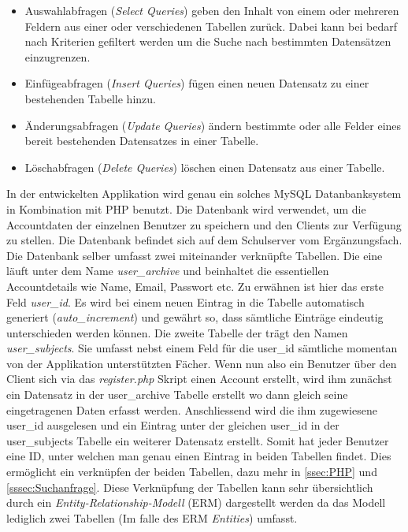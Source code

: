 \documentclass[a4paper,11pt]{report}
\begin{document}
				\begin{itemize}
					\item Auswahlabfragen (\emph{Select Queries}) geben den Inhalt von einem oder mehreren Feldern aus einer oder verschiedenen Tabellen zurück. Dabei kann bei bedarf nach Kriterien gefiltert werden um die Suche nach bestimmten Datensätzen einzugrenzen.\cite{IT-Handbuch}
					\item Einfügeabfragen (\emph{Insert Queries}) fügen einen neuen Datensatz zu einer bestehenden Tabelle hinzu.\cite{IT-Handbuch}
					\item Änderungsabfragen (\emph{Update Queries}) ändern bestimmte oder alle Felder eines bereit bestehenden Datensatzes in einer Tabelle.\cite{IT-Handbuch}
					\item Löschabfragen (\emph{Delete Queries}) löschen einen Datensatz aus einer Tabelle. \cite{IT-Handbuch}
				\end{itemize}
				In der entwickelten Applikation wird genau ein solches MySQL Datanbanksystem in Kombination mit PHP benutzt. Die Datenbank wird verwendet, um die Accountdaten der einzelnen Benutzer zu speichern und den Clients zur Verfügung zu stellen. Die Datenbank befindet sich auf dem Schulserver vom Ergänzungsfach. Die Datenbank selber umfasst zwei miteinander verknüpfte Tabellen. Die eine läuft unter dem Name \emph{user\_archive} und beinhaltet die essentiellen Accountdetails wie Name, Email, Passwort etc. Zu erwähnen ist hier das erste Feld \emph{user\_id}. Es wird bei einem neuen Eintrag in die Tabelle automatisch generiert (\emph{auto\_increment}) und gewährt so, dass sämtliche Einträge eindeutig unterschieden werden können. Die zweite Tabelle der trägt den Namen \emph{user\_subjects}. Sie umfasst nebst einem Feld für die user\_id sämtliche momentan von der Applikation unterstützten Fächer. Wenn nun also ein Benutzer über den Client sich via das \emph{register.php} Skript einen Account erstellt, wird ihm zunächst ein Datensatz in der user\_archive Tabelle erstellt wo dann gleich seine eingetragenen Daten erfasst werden. Anschliessend wird die ihm zugewiesene user\_id ausgelesen und ein Eintrag unter der gleichen user\_id in der user\_subjects Tabelle ein weiterer Datensatz erstellt. Somit hat jeder Benutzer eine ID, unter welchen man genau einen Eintrag in beiden Tabellen findet. Dies ermöglicht ein verknüpfen der beiden Tabellen, dazu mehr in \ref{ssec:PHP} und \ref{sssec:Suchanfrage}. Diese Verknüpfung der Tabellen kann sehr übersichtlich durch ein \emph{Entity-Relationship-Modell} (ERM) dargestellt werden da das Modell lediglich zwei Tabellen (Im falle des ERM \emph{Entities}) umfasst.
				
\end{document}
